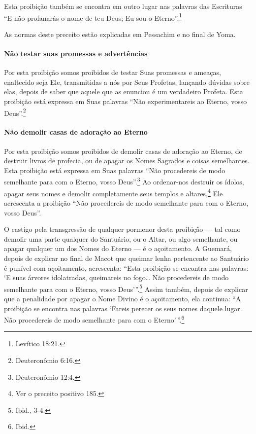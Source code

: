 Esta proibição também se encontra em outro lugar nas palavras das
Escrituras ``E não profanarás o nome de teu Deus; Eu sou o Eterno''.\footnote{Levítico 18:21.}

As normas deste preceito estão explicadas em Pessachim e no final de Yoma.

\paragraph{Não testar suas promessas e advertências}

Por esta proibição somos proibidos de testar Suas promessas e ameaças,
enaltecido seja Ele, transmitidas a nós por Seus Profetas, lançando
dúvidas sobre elas, depois de saber que aquele que as enunciou é um
verdadeiro Profeta. Esta proibição está expressa em Suas palavras ``Não
experimentareis ao Eterno, vosso Deus''.\footnote{Deuteronômio 6:16.}

\paragraph{Não demolir casas de adoração ao Eterno}

Por esta proibição somos proibidos de demolir casas de adoração ao
Eterno, de destruir livros de profecia, ou de apagar os Nomes Sagrados e
coisas semelhantes. Esta proibição está expressa em Suas palavras ``Não
procedereis de modo semelhante para com o Eterno, vosso Deus''.\footnote{Deuteronômio 12:4.} Ao ordenar-nos destruir os ídolos, apagar seus
nomes e demolir completamente seus templos e
altares,\footnote{Ver o preceito positivo 185.} Ele acrescenta a proibição ``Não
procedereis de modo semelhante para com o Eterno, vosso Deus''.

O castigo pela transgressão de qualquer pormenor desta proibição --- tal
como demolir uma parte qualquer do Santuário, ou o Altar, ou algo
semelhante, ou apagar qualquer um dos Nomes do Eterno --- é o
açoitamento. A Guemará, depois de explicar no final de Macot que queimar
lenha pertencente ao Santuário é punível com açoitamento, acrescenta:
``Esta proibição se encontra nas palavras: `E suas árvores idolatradas,
queimareis no fogo\ldots{} Não procedereis de modo semelhante para com o
Eterno, vosso Deus'''.\footnote{Ibid., 3-4.} Assim também, depois de explicar
que a penalidade por apagar o Nome Divino é o açoitamento, ela continua:
``A proibição se encontra nas palavras `Fareis perecer os seus nomes
daquele lugar. Não procedereis de modo semelhante para com o Eterno'\,''.\footnote{Ibid.}

